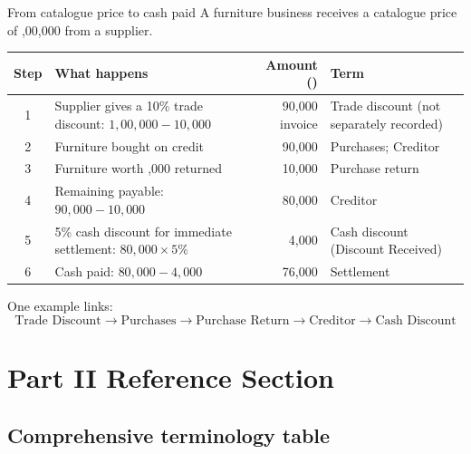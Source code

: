 \documentclass[11pt,a4paper]{article}
\newcommand{\Rs}{\ifmmode\text{\rsfont ₹}\else{\rsfont ₹}\fi}
\begin{document}
\begin{casebox}{From catalogue price to cash paid}
A furniture business receives a catalogue price of \Rs 1,00,000 from a supplier.

\begin{center}
\small
\begin{tabularx}{\textwidth}{@{}c Y r Y@{}}
\toprule
{}\textbf{Step} & \textbf{What happens} & \textbf{Amount (\Rs)} & \textbf{Term}\\
 & Supplier gives a 10\% trade discount: $1{,}00{,}000-10{,}000$ & 90,000 invoice & Trade discount (not separately recorded)\\
2 & Furniture bought on credit & 90,000 & Purchases; Creditor\\
3 & Furniture worth \Rs 10,000 returned & 10,000 & Purchase return\\
4 & Remaining payable: $90{,}000-10{,}000$ & 80,000 & Creditor\\
5 & 5\% cash discount for immediate settlement: $80{,}000\times5\%$ & 4,000 & Cash discount (Discount Received)\\
6 & Cash paid: $80{,}000-4{,}000$ & 76,000 & Settlement\\
\bottomrule
\end{tabularx}
\end{center}
One example links:
\[
\text{Trade Discount}\rightarrow\text{Purchases}\rightarrow\text{Purchase Return}\rightarrow\text{Creditor}\rightarrow\text{Cash Discount}
\]
\end{casebox}

\section{Part II Reference Section}

\subsection{Comprehensive terminology table}
\end{document}
